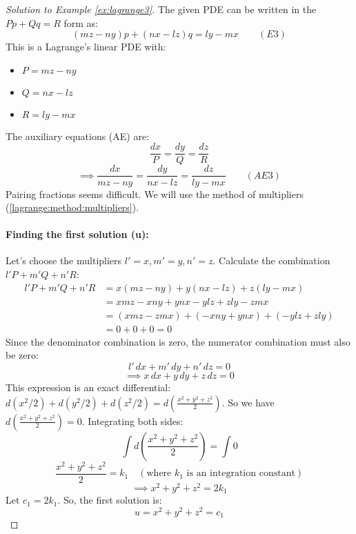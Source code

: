\documentclass{article}
\theoremstyle{remark}
\begin{document}
	\begin{proof}[Solution to Example \ref{ex:lagrange3}]
		The given PDE can be written in the $Pp+Qq=R$ form as:
		\[ (mz-ny)p + (nx-lz)q = ly-mx \quad \quad (E3) \]
		This is a Lagrange's linear PDE with:
		\begin{itemize}
			\item $P = mz-ny$
			\item $Q = nx-lz$
			\item $R = ly-mx$
		\end{itemize}
		The auxiliary equations (AE) are:
		\[
		\frac{dx}{P} = \frac{dy}{Q} = \frac{dz}{R}
		\]
		\[
		\implies \frac{dx}{mz-ny} = \frac{dy}{nx-lz} = \frac{dz}{ly-mx} \quad \quad (AE3)
		\]
		Pairing fractions seems difficult. We will use the method of multipliers (\ref{lagrange:method:multipliers}).
		
		\paragraph{Finding the first solution (u):}
		Let's choose the multipliers $l'=x, m'=y, n'=z$.
		Calculate the combination $l'P + m'Q + n'R$:
		\begin{align*} l'P + m'Q + n'R &= x(mz-ny) + y(nx-lz) + z(ly-mx) \\ &= xmz - xny + ynx - ylz + zly - zmx \\ &= (xmz - zmx) + (-xny + ynx) + (-ylz + zly) \\ &= 0 + 0 + 0 = 0 \end{align*}
		Since the denominator combination is zero, the numerator combination must also be zero:
		\[
		l'\,dx + m'\,dy + n'\,dz = 0
		\]
		\[
		\implies x\,dx + y\,dy + z\,dz = 0
		\]
		This expression is an exact differential: $d(x^2/2) + d(y^2/2) + d(z^2/2) = d\left(\frac{x^2+y^2+z^2}{2}\right)$.
		So we have $d\left(\frac{x^2+y^2+z^2}{2}\right) = 0$.
		Integrating both sides:
		\[
		\int d\left(\frac{x^2+y^2+z^2}{2}\right) = \int 0
		\]
		\[
		\frac{x^2+y^2+z^2}{2} = k_1 \quad (\text{where } k_1 \text{ is an integration constant})
		\]
		\[
		\implies x^2+y^2+z^2 = 2k_1
		\]
		Let $c_1 = 2k_1$. So, the first solution is:
		\[
		u = x^2+y^2+z^2 = c_1
		\]
		

\end{proof}
\end{document}
